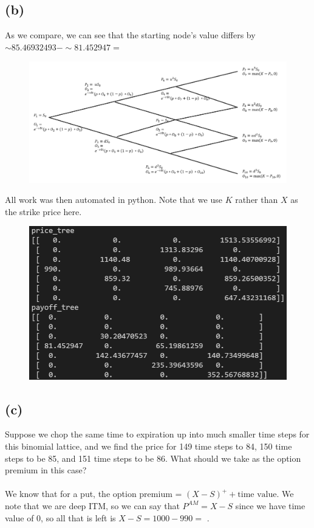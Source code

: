 \documentclass{article}
\begin{document}
{\newpage

\subsection*{(b)}

As we compare, we can see that the starting node's value differs by $\sim 85.46932493 - \sim 81.452947 = $ 

\begin{figure}[h]
  \centering
  \includegraphics[width=120mm]{./2b_tree.png}
\end{figure}

All work was then automated in python. Note that we use $K$ rather than $X$ as the strike price here. 

\begin{figure}[h]
  \centering
  \includegraphics[width=120mm]{./2b.png}
\end{figure}

\newpage

\subsection*{(c)}

Suppose we chop the same time to expiration up into much smaller time steps for this binomial lattice, and we find the price for 149 time steps to 84, 150 time steps to be 85, and 151 time steps to be 86. What should we take as the option premium in this case? \\ \\

We know that for a put, the option premium = $(X - S)^+ + \text{time value}$. We note that we are deep ITM, so we can say that $P^{AM} = X - S$ since we have time value of $0$, so all that is left is $X - S = 1000 - 990 = $ . 

\newpage
}
\end{document}
